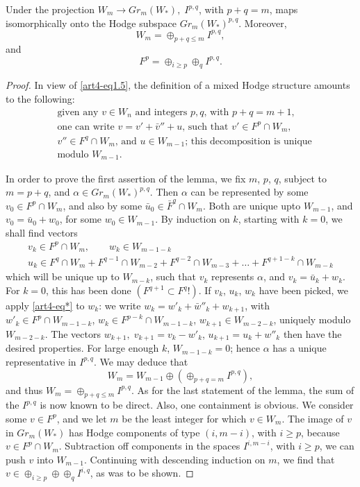 \setcounter{lemma}{11}
\begin{lemma}\label{art4-lem1.12}
Under the projection $W_m \to Gr_m (W_\ast), \; I^{p,q}$, with $p+q=m$, maps isomorphically onto the Hodge subspace $Gr_m (W_\ast)^{p,q}$. Moreover,
$$
W_m = \oplus_{p+q\leqslant m} I^{p,q},
$$
and 
$$
F^p = \oplus_{i \geqslant p} \oplus_q I^{p,q}.
$$
\end{lemma}

\begin{proof}
In view of \eqref{art4-eq1.5}, the definition of a mixed Hodge structure amounts to the following:
\begin{align*}
& \text{given any $v \in W_n$ and integers $p,q$, with $p+q=m+1$,}\\
& \text{one can write $v = v'+\bar{v}'' + u $, such that $v' \in F^p \cap W_m$,}\\
& \text{$v'' \in F^q \cap W_m$, and $u\in W_{m-1}$; this decomposition is unique}\\
& \text{modulo $W_{m-1}$}. \tag{$\ast$}\label{art4-eq*}
\end{align*}

In order to prove the first assertion of the lemma, we fix $m$, $p$, $q$, subject to $m=p+q$, and $\alpha \in Gr_m (W_\ast)^{p,q}$. Then $\alpha$ can be represented by some\pageoriginale $v_0\in F^p \cap W_m$, and also by some $\bar{u}_0 \in \bar{F}^q \cap W_m$. Both are unique upto $W_{m-1}$, and $v_0 = \bar{u}_0 + w_0$, for some $w_0 \in W_{m-1}$. By induction on $k$, starting with $k=0$, we shall find vectors
\begin{gather*}
v_k \in F^p \cap W_m, \qquad w_k \in W_{m-1-k}\\
u_k \in F^q \cap W_m + F^{q-1} \cap W_{m-2} + F^{q-2} \cap W_{m-3} + \ldots + F^{q+1-k} \cap W_{m-k}
\end{gather*}
which will be unique up to $W_{m-k}$, such that $v_k$ represents $\alpha$, and $v_k = \bar{u}_k + w_k$. For $k=0$, this has been done $(F^{q+1} \subset F^q !)$.  If $v_k$, $u_k$, $w_k$ have been picked, we apply \eqref{art4-eq*} to $w_k$: we write $w_k = w'_k + \bar{w}''_k + w_{k+1}$, with $w'_k \in F^p \cap W_{m-1-k}$, $w_k \in F^{p-k} \cap W_{m-1-k}$, $w_{k+1} \in W_{m-2-k}$, uniquely modulo $W_{m-2-k}$. The vectors $w_{k+1}, \; v_{k+1} = v_k - w'_k$, $u_{k+1} =  u_k + w''_k$ then have the desired properties. For large enough $k$, $W_{m-1-k} = 0$; hence $\alpha$ has a unique representative in $I^{p,q}$. We may deduce that
$$
W_m = W_{m-1} \oplus (\oplus_{p+q=m} I^{p,q}),
$$
and thus $W_m = \oplus_{p+q\leqslant m} I^{p,q}$. As for the last statement of the lemma, the sum of the $I^{p,q}$ is now known to be direct. Also, one containment is obvious. We consider some $v \in F^p$, and we let $m$ be the least integer for which $v \in W_m$. The image of $v$ in $Gr_m (W_\ast)$ has Hodge components of type $(i, m-i)$, with $i \geqslant p$, because $v \in F^p \cap W_m$. Subtraction off components in the spaces $I^{i,m-i}$, with $i \geqslant p$, we can push $v$ into $W_{m-1}$. Continuing with descending induction on $m$, we find that $v \in \oplus_{i \geqslant p} \oplus \oplus_q I^{i,q}$, as was to be shown.
 

\end{proof}
